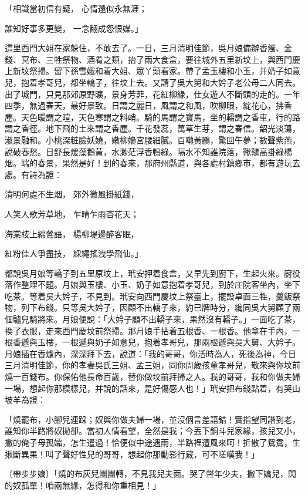 「相識當初信有疑，  心情還似永無涯；

誰知好事多更變，  一念翻成怨恨媒。」

這里西門大姐在家躲住，不敢去了。一日，三月清明佳節，吳月娘備辦香燭、金錢、冥布、三牲祭物、酒肴之類，抬了兩大食盒，要往城外五里新坟上，與西門慶上新坟祭掃。留下孫雪娥和着大姐、眾丫頭看家。帶了孟玉樓和小玉，并奶子如意兒，抱着孝哥兒，都坐轎子，往坟上去。又請了吳大舅和大妗子老公母二人同去。出了城門，只見那郊原野曠，景身芳菲，花紅柳綠，仕女遊人不斷頭的走的。一年四季，無過春天，最好景致。日謂之麗日，風謂之和風，吹柳眼，綻花心，拂香塵。天色暖謂之暄，天色寒謂之料峭。騎的馬謂之寶馬，坐的轎謂之香車，行的路謂之香徑。地下飛的土來謂之香塵。千花發蕊，萬草生芽，謂之春信。韶光淡蕩，淑景融和。小桃深粧臉妖嬈，嫩柳嬝宮腰細膩。百囀黃鸝，驚回午夢；數聲紫燕，說破春愁。日舒長煖藻鵝黃，水渺茫浮香鴨綠。隔水不知誰院落，鞦韆高掛綠楊烟。端的春景，果然是好！到的春來，那府州縣道，與各處村鎮鄉市，都有遊玩去處。有詩為證：

清明何處不生烟，  郊外微風掛紙錢，

人笑人歌芳草地，  乍晴乍雨杏花天；

海棠枝上綿鶯語，  楊柳堤邊醉客眠，

紅粉佳人爭盡技，  綵繩搖洩學飛仙。」

都說吳月娘等轎子到五里原坟上，玳安押着食盒，又早先到廚下，生起火來。廚役落作整理不題。月娘與玉樓、小玉、奶子如意抱着孝哥兒，到於庄院客坐內，坐下吃茶。等着吳大妗子，不見到。玳安向西門慶坟上祭臺上，擺設卓面三牲，羹飯祭物，列下布錢。只等吳大妗子，因顧不出轎子來，約巳牌時分，纔同吳大舅顧了兩個驢兒騎將來。月娘便說：「大妗子顧不出轎子來，果然沒有轎子。」一面吃了茶，換了衣服，走來西門慶坟前祭掃。那月娘手拈着五根香、一根香。他拿在手內，一根香遞與玉樓，一根遞與奶子如意兒，抱着孝哥兒，那兩根遞與吳大舅、大妗子。月娘插在香爐內，深深拜下去，說道：「我的哥哥，你活時為人，死後為神，今日三月清明佳節，你的孝妻吳氏三姐、孟三姐，同你周歲孩童孝哥兒，敬來與你坟前燒一百錢布。你保佑他長命百歲，替你做坟前拜掃之人。我的哥哥，我和你做夫婦一場，想起你那模樣兒，并說的話來，是好傷感人也！」玳安把布錢點着，有哭山坡羊為證：

「燒罷布，小腳兒連跺；奴與你做夫婦一場，並沒個言差語錯！實指望同諧到老，誰知你半路將奴拋卻。當初人情看望，全然是我；今丟下銅斗兒家緣，孩兒又小，撇的俺子母孤孀，怎生遣過！恰便似中途遇雨，半路裡遭風來呵！折散了鴛鴦，生揪斷異果！叫了聲好性兒的哥哥，想起你那動影行藏，可不嗟嘆我！」

〔帶步步嬌〕「燒的布灰兒團團轉，不見我兒夫面。哭了聲年少夫，撇下嬌兒，閃的奴孤單！咱兩無緣，怎得和你重相見！」

